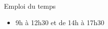 \begin{frame}{Emploi du temps}
  \begin{itemize}
  \item 9h à 12h30 et de 14h à 17h30
  \end{itemize}
\end{frame}
